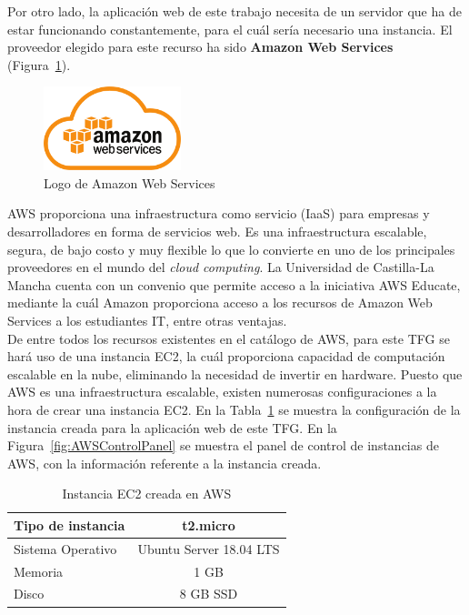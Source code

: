 Por otro lado, la aplicación web de este trabajo necesita de un servidor que ha de estar funcionando constantemente, para el cuál sería necesario una instancia. El proveedor elegido para este recurso ha sido \textbf{Amazon Web Services}~\cite{AWS} (Figura~\ref{fig:AWS}).
\begin{figure}[H]
            \centering
            \includegraphics[width=4cm]{figs/aws_logo.png}
            \caption{Logo de Amazon Web Services}
            \label{fig:AWS}
\end{figure}

\gls{AWS} proporciona una infraestructura como servicio (\gls{IaaS}) para empresas y desarrolladores en forma de servicios web. Es una infraestructura escalable, segura, de bajo costo y muy flexible lo que lo convierte en uno de los principales proveedores en el mundo del \textit{cloud computing}. La Universidad de Castilla-La Mancha cuenta con un convenio que permite acceso a la iniciativa AWS Educate, mediante la cuál Amazon proporciona acceso a los recursos de Amazon Web Services a los estudiantes IT, entre otras ventajas.\\
De entre todos los recursos existentes en el catálogo de \gls{AWS}, para este \gls{TFG} se hará uso de una instancia \gls{EC2}, la cuál proporciona capacidad de computación escalable en la nube, eliminando la necesidad de invertir en hardware. Puesto que \gls{AWS} es una infraestructura escalable, existen numerosas configuraciones a la hora de crear una instancia \gls{EC2}. En la Tabla~\ref{tab:EC2instance} se muestra la configuración de la instancia creada para la aplicación web de este \gls{TFG}. En la Figura~\ref{fig:AWSControlPanel} se muestra el panel de control de instancias de \gls{AWS}, con la información referente a la instancia creada.
\begin{table}[hp]
        \centering
        \begin{tabular}{|l|c|}
                \hline
                Tipo de instancia & t2.micro \\ \hline
                Sistema Operativo & Ubuntu Server 18.04 LTS \\ \hline
                Memoria & 1 GB \\ \hline
                Disco & 8 GB SSD \\ \hline
             \end{tabular}
        \caption{Instancia EC2 creada en AWS}
        \label{tab:EC2instance}
\end{table}

